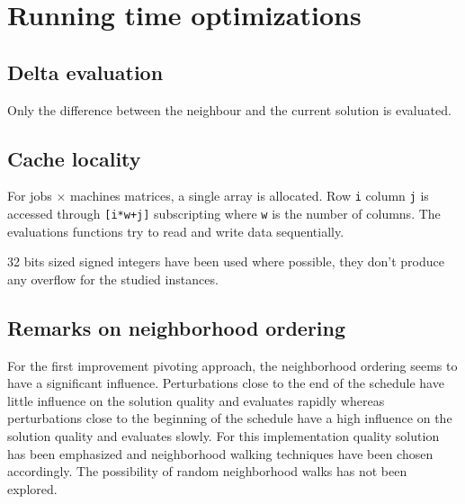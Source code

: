 \newpage\cleardoublepage{}
\section{Running time optimizations}

\subsection{Delta evaluation}

Only the difference between the neighbour and the current solution is evaluated.

\subsection{Cache locality}

For jobs $\times$ machines matrices, a single array is allocated. Row \verb!i! column \verb!j! is accessed through \verb![i*w+j]! subscripting where \verb!w! is the number of columns. The evaluations functions try to read and write data sequentially.

32 bits sized signed integers have been used where possible, they don't produce any overflow for the studied instances.

\subsection{Remarks on neighborhood ordering}

For the first improvement pivoting approach, the neighborhood ordering seems to have a significant influence. Perturbations close to the end of the schedule have little influence on the solution quality and evaluates rapidly whereas perturbations close to the beginning of the schedule have a high influence on the solution quality and evaluates slowly. For this implementation quality solution has been emphasized and neighborhood walking techniques have been chosen accordingly. The possibility of random neighborhood walks has not been explored.